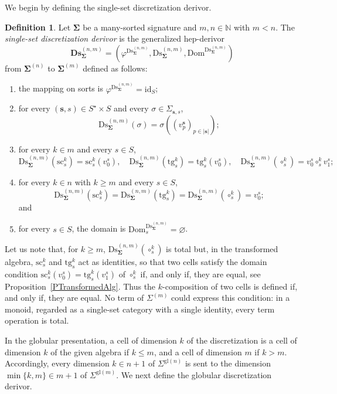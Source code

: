 \documentclass[a4paper, reqno
]{amsart}
\newcommand{\bb}[1]{\ensuremath{\lvert #1 \rvert}}
\newcommand{\sig}[1]{\mathbf{#1}}             %
\newcommand{\Dom}{\mathrm{Dom}}
\newcommand{\id}{\mathrm{id}}
\newcommand{\gl}{\mathrm{gl}}                %
\newcommand{\src}{\mathrm{sc}}
\newcommand{\tgt}{\mathrm{tg}}
\newcommand{\Ds}{\mathrm{Ds}}
\newcommand{\bDs}{\mathbf{Ds}}
\theoremstyle{plain}
\theoremstyle{definition}
\newtheorem{definition}[theorem]{Definition}
\begin{document}
We begin by defining the single-set discretization derivor.

\begin{definition}\label{DDiscDerivor}
Let $\sig{\Sigma}$ be a many-sorted signature and $m,n\in\mathbb{N}$ with $m<n$.
The \emph{single-set discretization derivor} is the generalized hep-derivor
$$
\bDs^{(n,m)}_{\sig{\Sigma}}=\left(\varphi^{\Ds^{(n,m)}_{\sig{\Sigma}}},\Ds^{(n,m)}_{\sig{\Sigma}},\Dom^{\Ds^{(n,m)}_{\sig{\Sigma}}}\right)
$$
from $\sig{\Sigma}^{(n)}$ to $\sig{\Sigma}^{(m)}$ defined as follows:
\begin{enumerate}
\item the mapping on sorts is $\varphi^{\Ds^{(n,m)}_{\sig{\Sigma}}}=\id_{S}$;
\item for every $(\mathbf{s},s)\in S^{\star}\times S$ and every $\sigma\in\Sigma_{\mathbf{s},s}$,
$$
\Ds^{(n,m)}_{\sig{\Sigma}}(\sigma)=\sigma((v^{\mathbf{s}}_{p})_{p\in\bb{\mathbf{s}}});
$$
\item for every $k\in m$ and every $s\in S$,
$$
\Ds^{(n,m)}_{\sig{\Sigma}}(\src^{k}_{s})=\src^{k}_{s}(v^{s}_{0}),\quad
\Ds^{(n,m)}_{\sig{\Sigma}}(\tgt^{k}_{s})=\tgt^{k}_{s}(v^{s}_{0}),\quad
\Ds^{(n,m)}_{\sig{\Sigma}}(\circ^{k}_{s})=v^{s}_{0}\circ^{k}_{s}v^{s}_{1};
$$
\item for every $k\in n$ with $k\geq m$ and every $s\in S$,
$$
\Ds^{(n,m)}_{\sig{\Sigma}}(\src^{k}_{s})=\Ds^{(n,m)}_{\sig{\Sigma}}(\tgt^{k}_{s})=\Ds^{(n,m)}_{\sig{\Sigma}}(\circ^{k}_{s})=v^{s}_{0};
$$
and
\item for every $s\in S$, the domain is $\Dom^{\Ds^{(n,m)}_{\sig{\Sigma}}}_{s}=\varnothing$.
\end{enumerate}
\end{definition}

Let us note that, for $k\geq m$, $\Ds^{(n,m)}_{\sig{\Sigma}}(\circ^{k}_{s})$ is total but, in the transformed algebra, $\src^{k}_{s}$ and $\tgt^{k}_{s}$ act as identities, so that two cells satisfy the domain condition $\src^{k}_{s}(v^{s}_{0})=\tgt^{k}_{s}(v^{s}_{1})$ of $\circ^{k}_{s}$ if, and only if, they are equal, see Proposition~\ref{PTransformedAlg}.
Thus the $k$-composition of two cells is defined if, and only if, they are equal.
No term of $\Sigma^{(m)}$ could express this condition: in a monoid, regarded as a single-set category with a single identity, every term operation is total.

In the globular presentation, a cell of dimension $k$ of the discretization is a cell of dimension $k$ of the given algebra if $k\leq m$, and a cell of dimension $m$ if $k>m$.
Accordingly, every dimension $k\in n+1$ of $\Sigma^{\gl(n)}$ is sent to the dimension $\min\{k,m\}\in m+1$ of $\Sigma^{\gl(m)}$.
We next define the globular discretization derivor.
\end{document}
